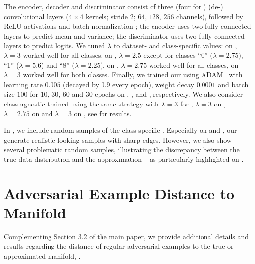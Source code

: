 \begin{appendix}
The encoder, decoder and discriminator consist of three (four for \Celeb) (de-) convolutional layers ($4{\times}4$ kernels; stride $2$; $64$, $128$, $256$ channels), followed by ReLU activations and batch normalization \cite{IoffeICML2015}; the encoder uses two fully connected layers to predict mean and variance; the discriminator uses two fully connected layers to predict logits. We tuned $\lambda$ to dataset- and class-specific values: on \Fonts, $\lambda = 3$ worked well for all classes, on \MNIST, $\lambda = 2.5$ except for classes ``0'' ($\lambda = 2.75$), ``1'' ($\lambda = 5.6$) and ``8'' ($\lambda = 2.25$), on \Fashion, $\lambda = 2.75$ worked well for all classes, on \Celeb $\lambda = 3$ worked well for both classes. Finally, we trained our \VAEGANs using ADAM~\cite{KingmaICLR2015} with learning rate $0.005$ (decayed by $0.9$ every epoch), weight decay $0.0001$ and batch size $100$ for $10$, $30$, $60$ and $30$ epochs on \Fonts, \MNIST, \Fashion and \Celeb, respectively. We also consider class-agnostic \VAEGANs trained using the same strategy with $\lambda = 3$ for \Fonts, $\lambda = 3$ on \MNIST, $\lambda =2.75$ on \Fashion and $\lambda=3$ on \Celeb, see  for results.

In , we include random samples of the class-specific \VAEGANs. Especially on \MNIST and \Fonts, our \VAEGANs generate realistic looking samples with sharp edges. However, we also show several problematic random samples, illustrating the discrepancy between the true data distribution and the approximation -- as particularly highlighted on \Fonts.

\section{Adversarial Example Distance to Manifold}
\label{sec:appendix-off-manifold}

Complementing Section 3.2 of the main paper, we provide additional details and results regarding the distance of regular adversarial examples to the true or approximated manifold, .


\end{appendix}
